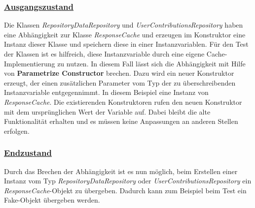 \documentclass[12pt]{article}
\begin{document}
\subsubsection*{\href{https://github.com/lukaspanni/OpenSourceStats/tree/3b1eb5bf6750c3ccaeb05962ec8a8ae743adbf2c/app/src/main/java/de/lukaspanni/opensourcestats/repository}{Ausgangszustand}}

Die Klassen \textit{RepositoryDataRepository} und \textit{UserContributionsRepository} haben eine Abhängigkeit zur Klasse \textit{ResponseCache} und erzeugen im Konstruktor eine Instanz dieser Klasse und speichern diese in einer Instanzvariablen.
Für den Test der Klassen ist es hilfreich, diese Instanzvariable durch eine eigene Cache-Implementierung zu nutzen.
In diesem Fall lässt sich die Abhängigkeit mit Hilfe von \textbf{Parametrize Constructor} brechen.
\newline
Dazu wird ein neuer Konstruktor erzeugt, der einen zusätzlichen Parameter vom Typ der zu überschreibenden Instanzvariable entgegennimmt. In diesem Beispiel eine Instanz von \textit{ResponseCache}. Die existierenden Konstruktoren rufen den neuen Konstruktor mit dem ursprünglichen Wert der Variable auf.
Dabei bleibt die alte Funktionalität erhalten und es müssen keine Anpassungen an anderen Stellen erfolgen.

\subsubsection*{\href{https://github.com/lukaspanni/OpenSourceStats/tree/d098b93ffd042cb095af679254ed01584417763e/app/src/main/java/de/lukaspanni/opensourcestats/repository}{Endzustand}}

Durch das Brechen der Abhängigkeit ist es nun möglich, beim Erstellen einer Instanz vom Typ \textit{RepositoryDataRepository} oder \textit{UserContributionsRepository} ein \textit{ResponseCache}-Objekt zu übergeben. Dadurch kann zum Beispiel beim Test ein Fake-Objekt übergeben werden.
\end{document}
